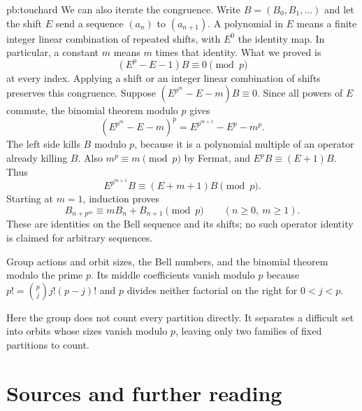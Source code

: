 \begin{solution}{pb:touchard}
We can also iterate the congruence. Write $B=(B_0,B_1,\ldots)$ and let the shift $E$ send a sequence $(a_n)$ to $(a_{n+1})$. A polynomial in $E$ means a finite integer linear combination of repeated shifts, with $E^0$ the identity map. In particular, a constant $m$ means $m$ times that identity. What we proved is
\[
(E^p-E-1)B\equiv0\pmod p
\]
at every index. Applying a shift or an integer linear combination of shifts preserves this congruence. Suppose $(E^{p^m}-E-m)B\equiv0$. Since all powers of $E$ commute, the binomial theorem modulo $p$ gives
\[
(E^{p^m}-E-m)^p=E^{p^{m+1}}-E^p-m^p.
\]
The left side kills $B$ modulo $p$, because it is a polynomial multiple of an operator already killing $B$. Also $m^p\equiv m\pmod p$ by Fermat, and $E^p B\equiv(E+1)B$. Thus
\[
E^{p^{m+1}}B\equiv(E+m+1)B\pmod p.
\]
Starting at $m=1$, induction proves
\[
B_{n+p^m}\equiv mB_n+B_{n+1}\pmod p\qquad(n\ge0,\ m\ge1).
\]
These are identities on the Bell sequence and its shifts; no such operator identity is claimed for arbitrary sequences.

\tools Group actions and orbit sizes, the Bell numbers, and the binomial theorem modulo the prime $p$. Its middle coefficients vanish modulo $p$ because $p!=\binom pj j!(p-j)!$ and $p$ divides neither factorial on the right for $0<j<p$.

\leads Here the group does not count every partition directly. It separates a difficult set into orbits whose sizes vanish modulo $p$, leaving only two families of fixed partitions to count.
\end{solution}

\section*{Sources and further reading}

